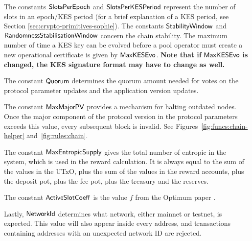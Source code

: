 The constants $\mathsf{SlotsPerEpoch}$ and $\mathsf{SlotsPerKESPeriod}$
represent the number of slots in an epoch/KES period (for a brief explanation
of a KES period, see Section \ref{sec:crypto-primitives-sophie}).
The constants $\mathsf{StabilityWindow}$ and $\mathsf{RandomnessStabilisationWindow}$ concern the chain stability.
The maximum number of time a KES key can be evolved before a pool operator
must create a new operational certificate is given by $\mathsf{MaxKESEvo}$.
\textbf{Note that if } $\mathsf{MaxKESEvo}$
\textbf{is changed, the KES signature format may have to change as well.}

The constant $\mathsf{Quorum}$ determines the quorum amount needed for votes on the
protocol parameter updates and the application version updates.

The constant $\mathsf{MaxMajorPV}$ provides a mechanism for halting outdated nodes.
Once the major component of the protocol version in the protocol parameters
exceeds this value, every subsequent block is invalid.
See Figures~\ref{fig:funcs:chain-helper} and~\ref{fig:rules:chain}.

The constant $\mathsf{MaxEntropicSupply}$ gives the total number of entropic in the system,
which is used in the reward calculation.
It is always equal to the sum of the values in the UTxO, plus the sum of the
values in the reward accounts, plus the deposit pot, plus the fee pot,
plus the treasury and the reserves.

The constant $\mathsf{ActiveSlotCoeff}$ is the value $f$ from the
Optimum paper \cite{shardagnostic_optimum}.

Lastly, $\mathsf{NetworkId}$ determines what network, either mainnet or testnet, is expected.
This value will also appear inside every address, and transactions
containing addresses with an unexpected network ID are rejected.

